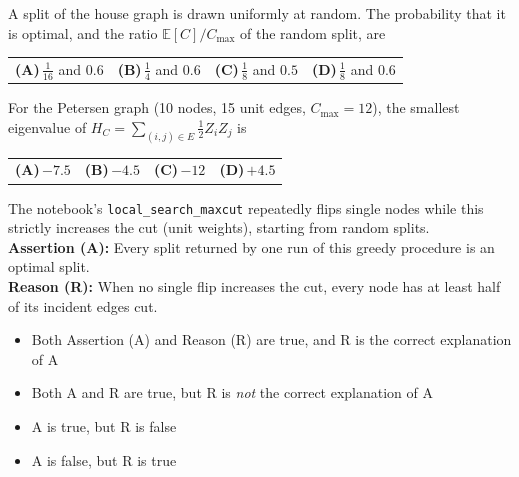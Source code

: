 \documentclass[11pt,a4paper]{article}
\newcommand{\optlabel}[1]{\textbf{(#1)}}
\newenvironment{qitem}[1]{\begin{list}{}{\setlength{\leftmargin}{3.3em}\setlength{\labelwidth}{3.1em}%
  \setlength{\labelsep}{0.2em}\setlength{\topsep}{3pt}\setlength{\parsep}{3pt}}\item[\textbf{Q.#1}\hfill]}{\end{list}}
\newcommand{\qsep}{\par\vspace{2pt}{\color{black!15}\hrule}\vspace{4pt}}
\begin{document}
\begin{qitem}{18}
A split of the house graph is drawn uniformly at random. The probability that it is optimal, and the ratio
$\mathbb{E}[C]/C_{\max}$ of the random split, are
\par\smallskip\noindent\begin{tabularx}{\linewidth}{@{}*{4}{L}@{}}
\optlabel{A}\,$\tfrac1{16}$ and $0.6$ & \optlabel{B}\,$\tfrac14$ and $0.6$ & \optlabel{C}\,$\tfrac18$ and $0.5$ & \optlabel{D}\,$\tfrac18$ and $0.6$
\end{tabularx}
\end{qitem}
\qsep

\begin{qitem}{19}
For the Petersen graph (10 nodes, 15 unit edges, $C_{\max} = 12$), the smallest eigenvalue of
$H_C = \sum_{(i,j)\in E}\tfrac12 Z_iZ_j$ is
\par\smallskip\noindent\begin{tabularx}{\linewidth}{@{}*{4}{L}@{}}
\optlabel{A}\,$-7.5$ & \optlabel{B}\,$-4.5$ & \optlabel{C}\,$-12$ & \optlabel{D}\,$+4.5$
\end{tabularx}
\end{qitem}
\qsep

\begin{qitem}{20}
The notebook's \texttt{local\_search\_maxcut} repeatedly flips single nodes while this strictly increases the cut
(unit weights), starting from random splits.\\[1mm]
\textbf{Assertion (A):} Every split returned by one run of this greedy procedure is an optimal split.\\[1mm]
\textbf{Reason (R):} When no single flip increases the cut, every node has at least half of its incident edges cut.
\begin{itemize}[leftmargin=2.6em, labelsep=0.4em, itemsep=2pt, topsep=3pt]
\item[\optlabel{A}] Both Assertion (A) and Reason (R) are true, and R is the correct explanation of A
\item[\optlabel{B}] Both A and R are true, but R is \emph{not} the correct explanation of A
\item[\optlabel{C}] A is true, but R is false
\item[\optlabel{D}] A is false, but R is true
\end{itemize}
\end{qitem}
\qsep

\newpage
\end{document}
